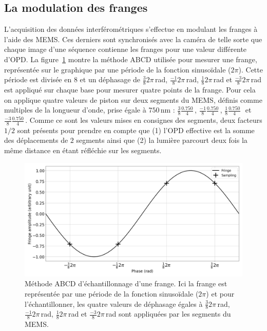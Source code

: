\subsection{La modulation des franges}
\label{sec:Modulation}

L'acquisition des données interférométriques s'effectue en modulant les franges à l'aide des \ac{MEMS}. Ces derniers sont synchronisés avec la caméra de telle sorte que chaque image d'une séquence contienne les franges pour une valeur différente d'\ac{OPD}. La figure~\ref{fig:FringeSamplingABCD} montre la méthode ABCD utilisée pour mesurer une frange, représentée sur le graphique par une période de la fonction sinusoïdale ($2 \pi$). Cette période est divisée en $8$ et un déphasage de $\frac{3}{8} 2 \pi \,$rad, $\frac{-1}{8} 2 \pi \,$rad, $\frac{1}{8} 2 \pi \,$rad et $\frac{-3}{8} 2 \pi \,$rad est appliqué sur chaque base pour mesurer quatre points de la frange. Pour cela on applique quatre valeurs de piston sur deux segments du \ac{MEMS}, définis comme multiples de la longueur d'onde, prise égale à $750 \,$nm : $\frac{3}{8} \frac{0.750}{4} \,$\um, $\frac{-1}{8} \frac{0.750}{4} \,$\um, $\frac{1}{8} \frac{0.750}{4} \,$\um~et $\frac{-3}{8} \frac{0.750}{4} \,$\um. Comme ce sont les valeurs mises en consignes des segments, deux facteurs $1/2$ sont présents pour prendre en compte que (1) l'\ac{OPD} effective est la somme des déplacements de $2$ segments ainsi que (2) la lumière parcourt deux fois la même distance en étant réfléchie sur les segments.

\begin{figure}[htp!]
    \centering
    \includegraphics[width=\figwidth]{Figure_Chap3/Fringe_Sampling_ABCD.png}
    \caption[Méthode ABCD d'échantillonnage d'une frange.]{Méthode ABCD d'échantillonnage d'une frange. Ici la frange est représentée par une période de la fonction sinusoïdale ($2 \pi$) et pour l'échantillonner, les quatre valeurs de déphasage égales à $\frac{3}{8} 2 \pi \,$rad, $\frac{-1}{8} 2 \pi \,$rad, $\frac{1}{8} 2 \pi \,$rad et $\frac{-3}{8} 2 \pi \,$rad sont appliquées par les segments du MEMS.}
    \label{fig:FringeSamplingABCD}
\end{figure}

